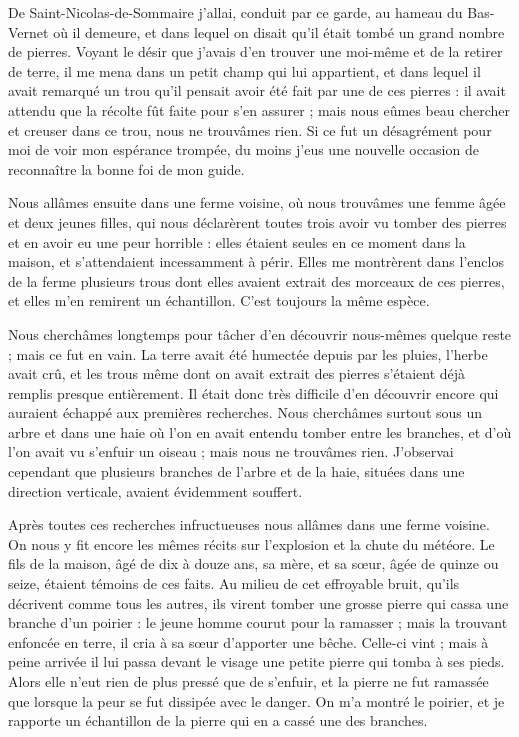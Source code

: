 \documentclass[a4paper, 11pt, oneside, polutonikogreek, french]{article}
\begin{document}
De Saint-Nicolas-de-Sommaire j'allai, conduit par ce garde, au hameau du Bas-Vernet où il demeure, et dans lequel on disait qu'il était tombé un grand nombre de pierres. Voyant le désir que j'avais d'en trouver une moi-même et de la retirer de terre, il me mena dans un petit champ qui lui appartient, et dans lequel il avait remarqué un trou qu'il pensait avoir été fait par une de ces pierres : il avait attendu que la récolte fût faite pour s'en assurer ; mais nous eûmes beau chercher et creuser dans ce trou, nous ne trouvâmes rien. Si ce fut un désagrément pour moi de voir mon espérance trompée, du moins j'eus une nouvelle occasion de reconnaître la bonne foi de mon guide.

Nous allâmes ensuite dans une ferme voisine, où nous trouvâmes une femme âgée et deux jeunes filles, qui nous déclarèrent toutes trois avoir vu tomber des pierres et en avoir eu une peur horrible : elles étaient seules en ce moment dans la maison, et s'attendaient incessamment à périr. Elles me montrèrent dans l'enclos de la ferme plusieurs trous dont elles avaient extrait des morceaux de ces pierres, et elles m'en remirent un échantillon. C'est toujours la même espèce.

Nous cherchâmes longtemps pour tâcher d'en découvrir nous-mêmes quelque reste ; mais ce fut en vain. La terre avait été humectée depuis par les pluies, l'herbe avait crû, et les trous même dont on avait extrait des pierres s'étaient déjà remplis presque entièrement. Il était donc très difficile d'en découvrir encore qui auraient échappé aux premières recherches. Nous cherchâmes surtout sous un arbre et dans une haie où l'on en avait entendu tomber entre les branches, et d'où l'on avait vu s'enfuir un oiseau ; mais nous ne trouvâmes rien. J'observai cependant que plusieurs branches de l'arbre et de la haie, situées dans une direction verticale, avaient évidemment souffert.

Après toutes ces recherches infructueuses nous allâmes dans une ferme voisine. On nous y fit encore les mêmes récits sur l'explosion et la chute du météore. Le fils de la maison, âgé de dix à douze ans, sa mère, et sa sœur, âgée de quinze ou seize, étaient témoins de ces faits. Au milieu de cet effroyable bruit, qu'ils décrivent comme tous les autres, ils virent tomber une grosse pierre qui cassa une branche d'un poirier : le jeune homme courut pour la ramasser ; mais la trouvant enfoncée en terre, il cria à sa sœur d'apporter une bêche. Celle-ci vint ; mais à peine arrivée il lui passa devant le visage une petite pierre qui tomba à ses pieds. Alors elle n'eut rien de plus pressé que de s'enfuir, et la pierre ne fut ramassée que lorsque la peur se fut dissipée avec le danger. On m'a montré le poirier, et je rapporte un échantillon de la pierre qui en a cassé une des branches.
\end{document}
